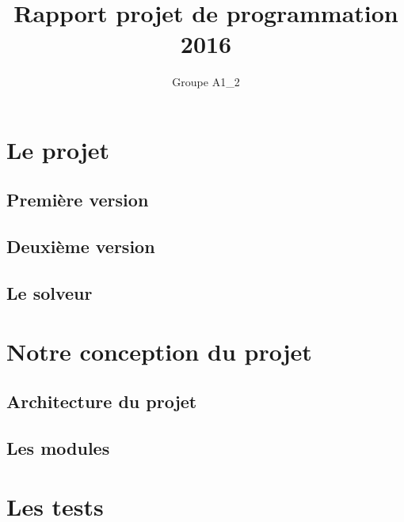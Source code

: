 \documentclass{article}
\title{Rapport projet de programmation 2016}
\author{Groupe A1\_2}
\begin{document}
\maketitle
\tableofcontents

\section{Le projet}%
\subsection{Première version}
\subsection{Deuxième version}
\subsection{Le solveur}


\section{Notre conception du projet}
\subsection{Architecture du projet}
\subsection{Les modules}


\section{Les tests}%
\end{document}
